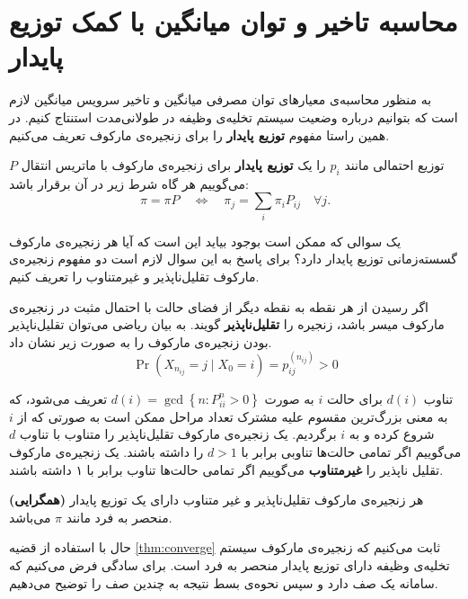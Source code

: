 \section{محاسبه تاخیر و توان میانگین با کمک توزیع پایدار}
به منظور محاسبه‌ی معیارهای توان مصرفی میانگین و تاخیر سرویس میانگین لازم است که بتوانیم درباره وضعیت سیستم تخلیه‌ی وظیفه در طولانی‌مدت استنتاج کنیم. در همین راستا مفهوم \textbf{توزیع پایدار} را برای زنجیره‌ی مارکوف تعریف می‌کنیم.
\begin{defi}
توزیع احتمالی مانند $p_i$ را یک \textbf{توزیع پایدار} برای زنجیره‌ی مارکوف با ماتریس انتقال \(P\) می‌گوییم هر گاه شرط زیر در آن برقرار باشد:
\begin{equation*}
	\pi=\pi P \quad \Longleftrightarrow \quad \pi_{j}=\sum_{i} \pi_{i} P_{i j} \quad \forall j .
\end{equation*}
\end{defi}
یک سوالی که ممکن است بوجود بیاید این است که آیا هر زنجیره‌ی مارکوف گسسته‌زمانی توزیع پایدار دارد؟ برای پاسخ به این سوال لازم است دو مفهوم زنجیره‌ی مارکوف تقلیل‌ناپذیر و غیرمتناوب را تعریف کنیم.
\begin{defi}
اگر رسیدن از هر نقطه به نقطه دیگر از فضای حالت با احتمال مثبت در زنجیره‌ی مارکوف میسر باشد، زنجیره را \textbf{تقلیل‌ناپذیر} گویند. به بیان ریاضی می‌توان تقلیل‌ناپذیر بودن زنجیره‌ی مارکوف را به صورت زیر نشان داد.
\begin{equation*}
	\operatorname{Pr}\left(X_{n_{i j}}=j \mid X_{0}=i\right)=p_{i j}^{\left(n_{i j}\right)}>0
\end{equation*}
\end{defi}

\begin{defi}
تناوب $d(i)$ برای حالت $i$ به صورت $d(i)=\operatorname{gcd}\left\{n: P_{i i}^{n}>0\right\}$ تعریف می‌شود، که به معنی بزرگ‌ترین مقسوم علیه مشترک تعداد مراحل ممکن است به صورتی که از $i$ شروع کرده و به $i$ برگردیم. یک زنجیره‌ی مارکوف تقلیل‌ناپذیر را متناوب با تناوب $d$ می‌گوییم اگر تمامی حالت‌ها تناوبی برابر با $d > 1$ را داشته باشند. یک زنجیره‌ی مارکوف تقلیل ناپذیر را \textbf{غیرمتناوب} می‌گوییم اگر تمامی حالت‌ها تناوب برابر با ۱ داشته باشند.
\end{defi}
\begin{thm}
\label{thm:converge}
\textbf{(همگرایی)}
هر زنجیره‌ی مارکوف تقلیل‌ناپذیر و غیر متناوب دارای یک توزیع پایدار منحصر به فرد مانند $\pi$ می‌باشد.
\end{thm}
حال با استفاده از قضیه \ref{thm:converge} ثابت می‌کنیم که زنجیره‌ی مارکوف سیستم تخلیه‌ی وظیفه دارای توزیع پایدار منحصر به فرد است. برای سادگی فرض می‌کنیم که سامانه یک صف دارد و سپس نحوه‌ی بسط نتیجه به چندین صف را توضیح می‌دهیم.

